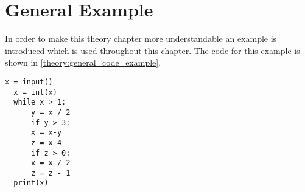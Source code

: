 \section{General Example}
In order to make this theory chapter more understandable an example is introduced which is used throughout this chapter.
The code for this example is shown in \cref{theory:general_code_example}.
\begin{lstlisting}[style=python, caption={The general code example used throughout the theory chapter.}, label={theory:general_code_example}]
  x = input()
  x = int(x)
  while x > 1:
      y = x / 2
      if y > 3:
      x = x-y
      z = x-4
      if z > 0:
      x = x / 2
      z = z - 1
  print(x)
\end{lstlisting}
